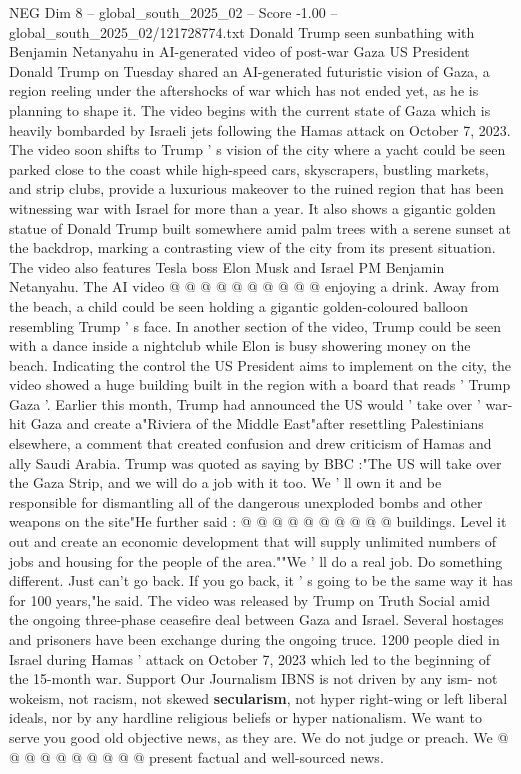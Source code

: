 \begin{textsample}{NEG Dim 8 – global\_south\_2025\_02 – Score -1.00 – global\_south\_2025\_02/121728774.txt}  \label{ex:f8_neg_061}
Donald Trump seen sunbathing with Benjamin Netanyahu in AI-generated video of post-war Gaza US President Donald Trump on Tuesday shared an AI-generated futuristic vision of Gaza, a region reeling under the aftershocks of war which has not ended yet, as he is planning to shape it.
The video begins with the current state of Gaza which is heavily bombarded by Israeli jets following the Hamas attack on October 7, 2023.
The video soon shifts to Trump ' s vision of the city where a yacht could be seen parked close to the coast while high-speed cars, skyscrapers, bustling markets, and strip clubs, provide a luxurious makeover to the ruined region that has been witnessing war with Israel for more than a year.
It also shows a gigantic golden statue of Donald Trump built somewhere amid palm trees with a serene sunset at the backdrop, marking a contrasting view of the city from its present situation.
The video also features Tesla boss Elon Musk and Israel PM Benjamin Netanyahu.
The AI video @ @ @ @ @ @ @ @ @ @ enjoying a drink.
Away from the beach, a child could be seen holding a gigantic golden-coloured balloon resembling Trump ' s face.
In another section of the video, Trump could be seen with a dance inside a nightclub while Elon is busy showering money on the beach.
Indicating the control the US President aims to implement on the city, the video showed a huge building built in the region with a board that reads ' Trump Gaza '.
Earlier this month, Trump had announced the US would ' take over ' war-hit Gaza and create a"Riviera of the Middle East"after resettling Palestinians elsewhere, a comment that created confusion and drew criticism of Hamas and ally Saudi Arabia.
Trump was quoted as saying by BBC :"The US will take over the Gaza Strip, and we will do a job with it too.
We ' ll own it and be responsible for dismantling all of the dangerous unexploded bombs and other weapons on the site"He further said : @ @ @ @ @ @ @ @ @ @ buildings.
Level it out and create an economic development that will supply unlimited numbers of jobs and housing for the people of the area.""We ' ll do a real job.
Do something different.
Just can't go back.
If you go back, it ' s going to be the same way it has for 100 years,"he said.
The video was released by Trump on Truth Social amid the ongoing three-phase ceasefire deal between Gaza and Israel.
Several hostages and prisoners have been exchange during the ongoing truce. 1200 people died in Israel during Hamas ' attack on October 7, 2023 which led to the beginning of the 15-month war.
Support Our Journalism IBNS is not driven by any ism- not wokeism, not racism, not skewed \textbf{secularism}, not hyper right-wing or left liberal ideals, nor by any hardline religious beliefs or hyper nationalism.
We want to serve you good old objective news, as they are.
We do not judge or preach.
We @ @ @ @ @ @ @ @ @ @ present factual and well-sourced news.

\end{textsample}

